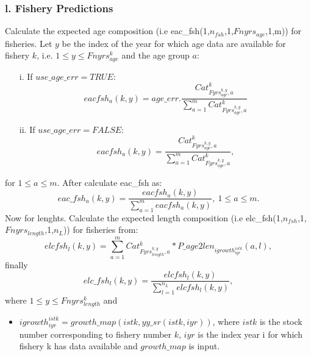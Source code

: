 \documentclass{article}
\begin{document}
\subsubsection{l. Fishery Predictions}
Calculate the expected age composition (i.e eac\_fsh(1,$n_{fsh}$,1,$Fnyrs_{age}$,1,m)) for fisheries. Let $y$ be the index of the year for which age data are available for fishery $k$, i.e.   $1\leq y \leq Fnyrs^k_{age}$ and the age group $a$:
\begin{itemize}
\item [i.] If $use\_age\_err=TRUE$:
    \begin{equation}
    {eac{fsh}}_a(k,y)=age\_err.\dfrac{Cat_{Fyrs^{k,y}_{age},a}^k}{\displaystyle\sum_{a=1}^mCat_{Fyrs^{k,y}_{age},a}^k}
\end{equation}
\item [ii.] If $use\_age\_err=FALSE$:
\begin{equation}
    eacfsh_a(k,y)=\dfrac{Cat_{Fyrs^{k,y}_{age},a}^k}{\displaystyle\sum_{a=1}^mCat_{Fyrs^{k,y}_{age},a}^k},
\end{equation}
\end{itemize}
for $1\leq a \leq m$.
After calculate eac\_fsh as:
\begin{equation}
    eac\_fsh_a(k,y)=\dfrac{eacfsh_a(k,y)}{\displaystyle\sum_{a=1}^m eacfsh_a(k,y)}, \ 1\leq a \leq m.
\end{equation}
Now for lenghts. Calculate the expected length composition (i.e elc\_fsh(1,$n_{fsh}$,1,$Fnyrs_{length}$,1,$n_L$)) for fisheries from: 
\begin{equation}
elcfsh_l(k,y)=\sum_{a=1}^m Cat_{Fyrs^{k,y}_{length},a}^k*P\_age2len_{igrowth^{istk}_{iyr}}(a,l),
\end{equation}
finally
\begin{equation}
elc\_fsh_l(k,y)=\dfrac{elcfsh_l(k,y)}{\displaystyle\sum_{l=1}^{n_L} elcfsh_l(k,y)},
\end{equation}
where $1\leq y \leq Fnyrs^k_{length}$ and \\
\begin{itemize}
    \item $igrowth^{istk}_{iyr}=growth\_map(istk,yy\_sr(istk,iyr))$, where $istk$ is the stock number corresponding to fishery number $k$, $iyr$ is the index year i for which fishery k has data available and $growth\_map$ is input.
\end{itemize}
\end{document}
